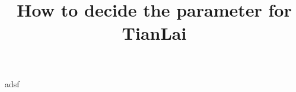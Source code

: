 \documentclass[10pt,a4paper]{article}
\title{How to decide the parameter for TianLai}
\begin{document}
adsf
\end{document}
